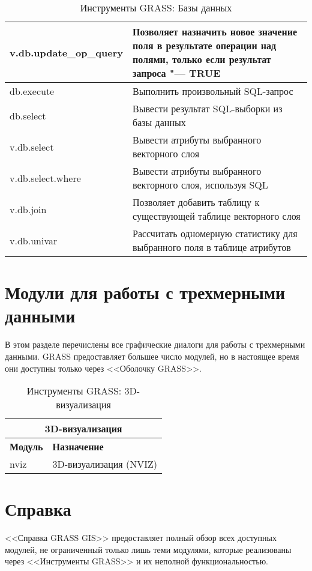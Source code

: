 {\begin{table}[H]
\begin{tabular}{|p{4cm}|p{11cm}|}
  \hline v.db.update\_op\_query & Позволяет назначить новое значение поля в
  результате операции над полями, только если результат запроса "--- TRUE \\
  \hline db.execute & Выполнить произвольный SQL-запрос \\
  \hline db.select & Вывести результат SQL-выборки из базы данных \\
  \hline v.db.select & Вывести атрибуты выбранного векторного слоя \\
  \hline v.db.select.where & Вывести атрибуты выбранного векторного
  слоя, используя SQL \\
  \hline v.db.join & Позволяет добавить таблицу к существующей таблице
  векторного слоя \\
  \hline v.db.univar & Рассчитать одномерную статистику для выбранного
  поля в таблице атрибутов \\
\hline
\end{tabular}
\caption{Инструменты GRASS: Базы данных}
\end{table}}

\clearpage

\section{Модули для работы с трехмерными данными}

В этом разделе перечислены все графические диалоги для работы с
трехмерными данными. GRASS предоставляет большее число модулей, но в
настоящее время они доступны только через <<Оболочку GRASS>>.

{\renewcommand{\arraystretch}{0.7}
\begin{table}[H]
\centering
 \begin{tabular}{|p{4cm}|p{11cm}|}
  \hline \multicolumn{2}{|c|}{\textbf{3D-визуализация}} \\
  \hline \textbf{Модуль} & \textbf{Назначение} \\
  \hline nviz & 3D-визуализация (NVIZ) \\
\hline
\end{tabular}
\caption{Инструменты GRASS: 3D-визуализация}
\end{table}}

\section{Справка}

<<Справка GRASS GIS>> предоставляет полный обзор всех доступных модулей,
не ограниченный только лишь теми модулями, которые реализованы через
<<Инструменты GRASS>> и их неполной функциональностью.

